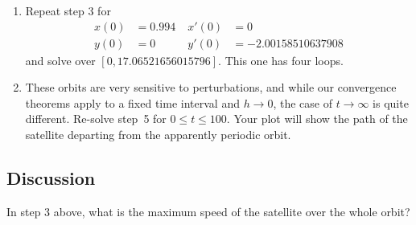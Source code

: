 \documentclass[11pt,twoside]{article}
\begin{document}
\begin{enumerate}
\item Repeat step 3 for 
      \begin{align*}
        x(0) &= 0.994 \; & x'(0) &= 0 \\
        y(0) &= 0 \; & y'(0) &= -2.00158510637908
      \end{align*}
      and solve over $[0,17.06521656015796]$. This one has four loops. 

\item These orbits are very sensitive to perturbations, and while our convergence theorems apply to a fixed time interval and $h\to 0$, the case of $t\to\infty$ is quite different. Re-solve step~5 for $0\le t \le 100$. Your plot will show the path of the satellite departing from the apparently periodic orbit. 
\end{enumerate}

\subsection*{Discussion}

In step 3 above, what is the maximum speed of the satellite over the whole orbit? 
\end{document}

